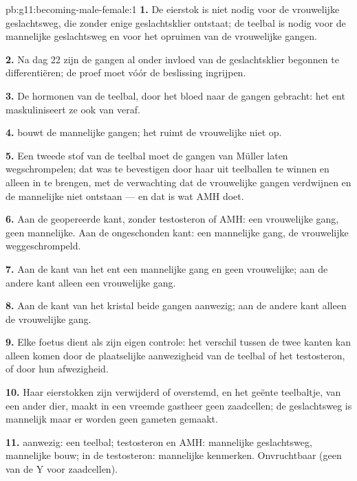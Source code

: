 \begin{solution}{pb:g11:becoming-male-female:1}
\textbf{1.} De eierstok is niet nodig voor de vrouwelijke geslachtsweg,
die zonder enige geslachtsklier ontstaat; de teelbal is nodig voor de
mannelijke geslachtsweg en voor het opruimen van de vrouwelijke gangen.

\textbf{2.} Na dag 22 zijn de gangen al onder invloed van de
geslachtsklier begonnen te differentiëren; de proef moet vóór de
beslissing ingrijpen.

\textbf{3.} De hormonen van de teelbal, door het bloed naar de gangen
gebracht: het ent maskuliniseert ze ook van veraf.

\textbf{4.}  bouwt de mannelijke gangen; het ruimt de
vrouwelijke niet op.

\textbf{5.} Een tweede stof van de teelbal moet de gangen van Müller
laten wegschrompelen; dat was te bevestigen door haar uit teelballen te
winnen en alleen in te brengen, met de verwachting dat de vrouwelijke
gangen verdwijnen en de mannelijke niet ontstaan --- en dat is wat AMH
doet.

\textbf{6.} Aan de geopereerde kant, zonder testosteron of AMH: een
vrouwelijke gang, geen mannelijke. Aan de ongeschonden kant: een
mannelijke gang, de vrouwelijke weggeschrompeld.

\textbf{7.} Aan de kant van het ent een mannelijke gang en geen
vrouwelijke; aan de andere kant alleen een vrouwelijke gang.

\textbf{8.} Aan de kant van het kristal beide gangen aanwezig; aan de
andere kant alleen de vrouwelijke gang.

\textbf{9.} Elke foetus dient als zijn eigen controle: het verschil
tussen de twee kanten kan alleen komen door de plaatselijke aanwezigheid
van de teelbal of het testosteron, of door hun afwezigheid.

\textbf{10.} Haar eierstokken zijn verwijderd of overstemd, en het geënte
teelbaltje, van een ander dier, maakt in een vreemde gastheer geen
zaadcellen; de geslachtsweg is mannelijk maar er worden geen gameten
gemaakt.

\textbf{11.}  aanwezig: een teelbal; testosteron en AMH: mannelijke
geslachtsweg, mannelijke bouw; in de  testosteron: mannelijke
kenmerken. Onvruchtbaar (geen  van de Y voor zaadcellen).


\end{solution}
